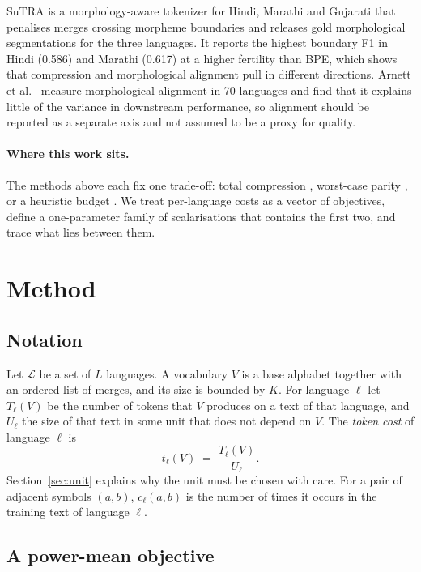 \documentclass[11pt,a4paper]{article}
\theoremstyle{remark}
\begin{document}
SuTRA \cite{rathore2026} is a morphology-aware tokenizer for Hindi, Marathi and Gujarati
that penalises merges crossing morpheme boundaries and releases gold morphological
segmentations for the three languages. It reports the highest boundary F1 in Hindi (0.586)
and Marathi (0.617) at a higher fertility than BPE, which shows that compression and
morphological alignment pull in different directions. Arnett et al.\ \cite{arnett2025}
measure morphological alignment in 70 languages and find that it explains little of the
variance in downstream performance, so alignment should be reported as a separate axis and
not assumed to be a proxy for quality.

\paragraph{Where this work sits.}
The methods above each fix one trade-off: total compression \cite{zouhar2023}, worst-case
parity \cite{foroutan2026}, or a heuristic budget \cite{brahma2026}. We treat per-language
costs as a vector of objectives, define a one-parameter family of scalarisations that
contains the first two, and trace what lies between them.

\section{Method}\label{sec:method}

\subsection{Notation}

Let $\mathcal{L}$ be a set of $L$ languages. A vocabulary $V$ is a base alphabet together
with an ordered list of merges, and its size is bounded by $K$. For language $\ell$ let
$T_\ell(V)$ be the number of tokens that $V$ produces on a text of that language, and
$U_\ell$ the size of that text in some unit that does not depend on $V$. The \emph{token
cost} of language $\ell$ is
\[
  t_\ell(V) \;=\; \frac{T_\ell(V)}{U_\ell}.
\]
Section~\ref{sec:unit} explains why the unit must be chosen with care. For a pair of
adjacent symbols $(a,b)$, $c_\ell(a,b)$ is the number of times it occurs in the training
text of language $\ell$.

\subsection{A power-mean objective}
\end{document}
